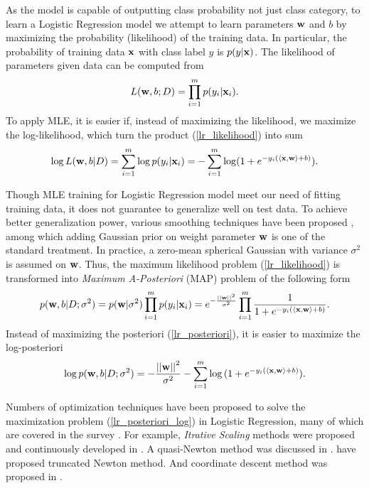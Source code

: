As the model is capable of outputting class probability not just class category, to learn a Logistic Regression model we attempt to learn parameters $\mathbf {w}$ and $b$ by maximizing the probability (likelihood) of the training data.
In particular, the probability of training data $\mathbf {x}$ with class label $y$ is $p(y|\mathbf {x})$.
The likelihood of parameters given data can be computed from
\begin{align}
	L(\mathbf {w},b;D) = \prod_{i=1}^mp(y_i|\mathbf {x}_i). \label{lr_likelihood}
\end{align}
To apply MLE, it is easier if, instead of maximizing the likelihood, we maximize the log-likelihood, which turn the product (\ref{lr_likelihood}) into sum
\begin{align}
	\log L(\mathbf {w},b|D) = \sum_{i=1}^{m}\log p(y_i|\mathbf {x}_i) = -\sum_{i=1}^{m}\log (1+e^{ -y_i(\langle \mathbf {x}, \mathbf {w} \rangle+b) }) \label{lr_likelihood_sum}.
\end{align}

Though MLE training for Logistic Regression model meet our need of fitting training data, it does not guarantee to generalize well on test data.
To achieve better generalization power, various smoothing techniques have been proposed \citep{Chen99,Chen00,Goodman03}, among which adding Gaussian prior on weight parameter $\mathbf {w}$ is one of the standard treatment.
In practice, a zero-mean spherical Gaussian with variance $\sigma^2$ is assumed on $\mathbf {w}$.
Thus, the maximum likelihood problem (\ref{lr_likelihood}) is transformed into \textit{Maximum A-Posteriori} (MAP) problem of the following form
\begin{align}
	p(\mathbf {w},b|D;\sigma^2) = p(\mathbf {w}|\sigma^2)\prod_{i=1}^mp(y_i|\mathbf {x}_i)=e^{ -\frac{\left|\left| \mathbf {w} \right|\right|^2}{\sigma^2} }\prod_{i=1}^{m}{\frac{1}{1+e^{ -y_i(\langle \mathbf {x}, \mathbf {w} \rangle+b) }}}. \label{lr_posteriori}
\end{align}
Instead of maximizing the posteriori (\ref{lr_posteriori}), it is easier to maximize the log-posteriori
\begin{align}
	\log p(\mathbf {w},b|D;\sigma^2) = -{\frac{\left|\left| \mathbf {w} \right|\right|^2}{\sigma^2}} - \sum_{i=1}^{m}\log{(1+e^{ -y_i(\langle \mathbf {x}, \mathbf {w}\rangle+b) })}. \label{lr_posteriori_log}
\end{align}

Numbers of optimization techniques have been proposed to solve the maximization problem (\ref{lr_posteriori_log}) in Logistic Regression, many of which are covered in the survey \citep{Minka03}.
For example, \textit{Itrative Scaling} methods were proposed and continuously developed in \citep{Darroch72,Pietra97,Berger97,Goodman02Sequential,Jin03a}.
A quasi-Newton method was discussed in \citep{Minka03}.
\citet{Komarek05making,Lin2008trust} have proposed truncated Newton method.
And coordinate descent method was proposed in \citep{Huang09iterative}.

